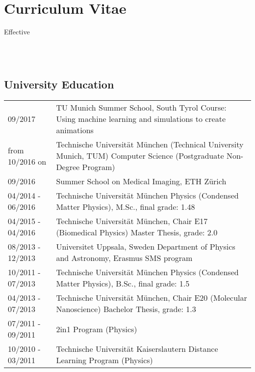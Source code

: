 \documentclass[a4paper,10pt]{memoir}
\begin{document}
\section*{\color{MidnightBlue} Curriculum Vitae}

\begin{flushright}
  Effective \monthname \, \the\year
\end{flushright}


\\
\\

\subsection*{University Education}
\vspace*{-\baselineskip}
\begin{longtable}{@{}p{} p{}}
  09/2017 &
  TU Munich Summer School, South Tyrol \newline
  Course: Using machine learning and simulations to create animations
  \\
  from 10/2016 on &
  Technische Universität München (Technical University Munich, TUM) \newline
  Computer Science (Postgraduate Non-Degree Program) 
  \\
  09/2016 &
  Summer School on Medical Imaging, ETH Zürich 
  \\
  04/2014 - 06/2016 &
  Technische Universität München \newline 
  Physics (Condensed Matter Physics), M.Sc., final grade: 1.48
  \\
  04/2015 - 04/2016 &
  Technische Universität München, Chair E17 (Biomedical Physics) \newline 
  Master Thesis, grade: 2.0
  \\
  08/2013 - 12/2013 &
  Universitet Uppsala, Sweden \newline 
  Department of Physics and Astronomy, Erasmus SMS program 
  \\
  10/2011 - 07/2013 &
  Technische Universität München \newline 
  Physics (Condensed Matter Physics), B.Sc., final grade: 1.5 
  \\
  04/2013 - 07/2013 &
  Technische Universität München, Chair E20 (Molecular Nanoscience) \newline 
  Bachelor Thesis, grade: 1.3
  \\
  07/2011 - 09/2011 &
  2in1 Program (Physics)
  \\
  10/2010 - 03/2011 &
  Technische Universität Kaiserslautern \newline 
  Distance Learning Program (Physics)
\end{longtable}
\end{document}
